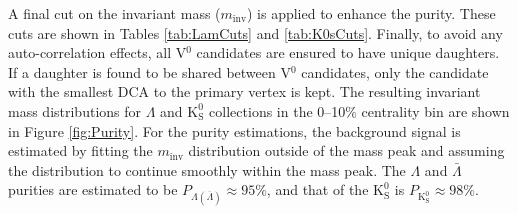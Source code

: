 \documentclass[ALICE,manyauthors]{cernphprep}
\newcommand{\minv}{$m_{\mathrm{inv}}$\xspace}
\newcommand{\Lam}{$\Lambda$\xspace}
\newcommand{\ALam}{$\bar{\Lambda}$\xspace}
\newcommand{\Ks}{$\mathrm{K^{0}_{S}}$\xspace}
\newcommand{\Vz}{V$^{0}$\xspace}
\begin{document}
A final cut on the invariant mass (\minv) is applied to enhance the purity.
These cuts are shown in Tables \ref{tab:LamCuts} and \ref{tab:K0sCuts}.
Finally, to avoid any auto-correlation effects, all \Vz candidates are ensured to have unique daughters. 
If a daughter is found to be shared between \Vz candidates, only the candidate with the smallest DCA to the primary vertex is kept.
The resulting invariant mass distributions for \Lam and \Ks collections in the 0--10\% centrality bin are shown in Figure \ref{fig:Purity}.
For the purity estimations, the background signal is estimated by fitting the \minv distribution outside of the mass peak and assuming the distribution to continue smoothly within the mass peak.
The \Lam and \ALam purities are estimated to be $P_{\Lambda(\overline{\Lambda})} \approx 95\%$, and that of the \Ks is $P_{\mathrm{K^{0}_{S}}} \approx 98\%$.
\end{document}
